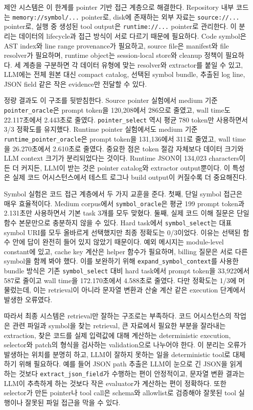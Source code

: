 \documentclass[11pt,a4paper]{article}
\begin{document}
제안 시스템은 이 한계를 pointer 기반 접근 계층으로 해결한다. Repository 내부 코드는 \texttt{memory://symbol/...} pointer로, disk에 존재하는 외부 자료는 \texttt{source://...} pointer로, 실행 중 생성된 tool output은 \texttt{runtime://...} pointer로 관리한다. 이 분리는 데이터의 lifecycle과 접근 방식이 서로 다르기 때문에 필요하다. Code symbol은 AST index와 line range provenance가 필요하고, source file은 manifest와 file resolver가 필요하며, runtime object는 session-local store와 cleanup 정책이 필요하다. 세 계층을 구분하면 각 데이터 유형에 맞는 resolver와 extractor를 붙일 수 있고, LLM에는 전체 원본 대신 compact catalog, 선택된 symbol bundle, 추출된 log line, JSON field 같은 작은 evidence만 전달할 수 있다.

정량 결과도 이 구조를 뒷받침한다. Source pointer 실험에서 medium 기준 \texttt{pointer\_oracle}은 prompt token을 120,208에서 286으로 줄였고, wall time도 22.117초에서 2.443초로 줄였다. \texttt{pointer\_select} 역시 평균 780 token만 사용하면서 3/3 정확도를 유지했다. Runtime pointer 실험에서도 medium 기준 \texttt{runtime\_pointer\_oracle}은 prompt token을 131,136에서 311로 줄였고, wall time을 26.270초에서 2.610초로 줄였다. 중요한 점은 token 절감 자체보다 데이터 크기와 LLM context 크기가 분리되었다는 것이다. Runtime JSON이 134,023 characters이든 더 커지든, LLM이 받는 것은 pointer catalog와 extractor output뿐이다. 이 특성은 실제 코드 어시스턴스에서 테스트 로그나 build output이 커질수록 더 중요해진다.

Symbol 실험은 코드 접근 계층에서 두 가지 교훈을 준다. 첫째, 단일 symbol 접근은 매우 효율적이다. Medium corpus에서 \texttt{symbol\_oracle}은 평균 199 prompt token과 2.131초만 사용하면서 기본 task 3개를 모두 맞혔다. 둘째, 실제 코드 이해 질문은 단일 함수 본문만으로 충분하지 않을 수 있다. Hard task에서 \texttt{symbol\_select}는 대표 symbol URI를 모두 올바르게 선택했지만 최종 정확도는 0/3이었다. 이유는 선택된 함수 안에 답이 완전히 들어 있지 않았기 때문이다. 예외 메시지는 module-level constant에 있고, cache key 계산은 helper 함수가 필요하며, billing 질문은 서로 다른 symbol을 함께 봐야 했다. 이를 보완하기 위해 \texttt{expand\_symbol\_context}를 사용한 bundle 방식은 기존 \texttt{symbol\_select} 대비 hard task에서 prompt token을 33,922에서 587로 줄이고 wall time을 172.170초에서 4.588초로 줄였다. 다만 정확도는 1/3에 머물렀는데, 이는 retrieval이 아니라 문자열 변환과 산술 계산 같은 execution 단계에서 발생한 오류였다.

따라서 최종 시스템은 retrieval만 잘하는 구조로는 부족하다. 코드 어시스턴스의 작업은 관련 파일과 symbol을 찾는 retrieval, 큰 자료에서 필요한 부분을 잘라내는 extraction, 찾은 코드를 실제 입력값에 대해 계산하는 deterministic execution, selector와 patch의 형식을 검사하는 validation으로 나누어야 한다. 이 분리는 오류가 발생하는 위치를 분명히 하고, LLM이 잘하지 못하는 일을 deterministic tool로 대체하기 위해 필요하다. 예를 들어 JSON path 추출은 LLM이 눈으로 긴 JSON을 읽게 하는 것보다 \texttt{extract\_json\_field}가 수행하는 편이 안정적이고, 문자열 변환 결과는 LLM이 추측하게 하는 것보다 작은 evaluator가 계산하는 편이 정확하다. 또한 selector가 만든 pointer나 tool call은 schema와 allowlist로 검증해야 잘못된 tool 실행이나 잘못된 파일 접근을 막을 수 있다.
\end{document}
